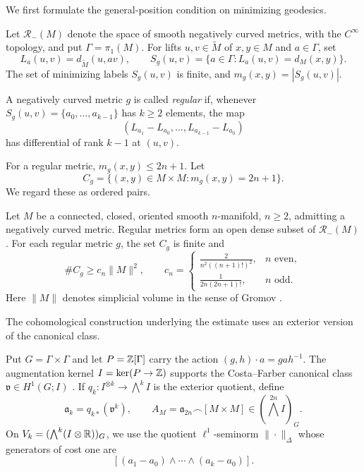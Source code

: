 We first formulate the general-position condition on minimizing geodesics.

Let $\mathcal R_-(M)$ denote the space of smooth negatively curved
metrics, with the $C^\infty$ topology, and put $\Gamma=\pi_1(M)$.
For lifts $u,v\in\widetilde M$ of $x,y\in M$ and $a\in\Gamma$, set
\[
 L_a(u,v)=d_{\widetilde M}(u,av),\qquad
 S_g(u,v)=\{a\in\Gamma:L_a(u,v)=d_M(x,y)\}.
\]
The set of minimizing labels $S_g(u,v)$ is finite, and
$m_g(x,y)=|S_g(u,v)|$.

\begin{definition}
A negatively curved metric $g$ is called \emph{regular} if, whenever
$S_g(u,v)=\{a_0,\ldots,a_{k-1}\}$ has $k\geq2$ elements, the map
\[
 (L_{a_1}-L_{a_0},\ldots,L_{a_{k-1}}-L_{a_0})
\]
has differential of rank $k-1$ at $(u,v)$.
\end{definition}

For a regular metric, $m_g(x,y)\leq2n+1$. Let
\[
 C_g=\{(x,y)\in M\times M:m_g(x,y)=2n+1\}.
\]
We regard these as ordered pairs.

\begin{theorem}\label{thm:intro-count}
Let $M$ be a connected, closed, oriented smooth $n$-manifold,
$n\geq2$, admitting a negatively curved metric.
Regular metrics form an open dense subset of $\mathcal R_-(M)$.
For each regular metric $g$, the set $C_g$ is finite and
\[
 \#C_g\geq c_n\|M\|^2,\qquad
 c_n=\begin{cases}
 \displaystyle\frac{2}{n^2((n+1)!)^2},&n\text{ even},\\[5pt]
 \displaystyle\frac{1}{2n(2n+1)!},&n\text{ odd}.
 \end{cases}
\]
Here $\|M\|$ denotes simplicial volume in the sense of
Gromov \cite{Gromov1982}.
\end{theorem}

The cohomological construction underlying the estimate uses an exterior version of the canonical class.

Put $G=\Gamma\times\Gamma$ and let $P=\mathbb{Z}[\Gamma]$ carry the action
$(g,h)\cdot a=gah^{-1}$. The augmentation kernel
$I=\ker(P\to\mathbb{Z})$ supports the Costa--Farber canonical class
$\mathfrak v\in H^1(G;I)$ \cite{CostaFarber2010}. If $q_k:I^{\otimes k}\to\bigwedge^k I$
is the exterior quotient, define
\[
 \mathfrak a_k=q_{k*}(\mathfrak v^k),\qquad
 A_M=\mathfrak a_{2n}\frown[M\times M]
 \in(\bigwedge^{2n}I)_G.
\]
On $V_k=(\bigwedge^k(I\otimes\mathbb{R}))_G$, we use the quotient
$\ell^1$-seminorm $\|\cdot\|_\Delta$ whose generators of cost one are
\[
 [(a_1-a_0)\wedge\cdots\wedge(a_k-a_0)].
\]


